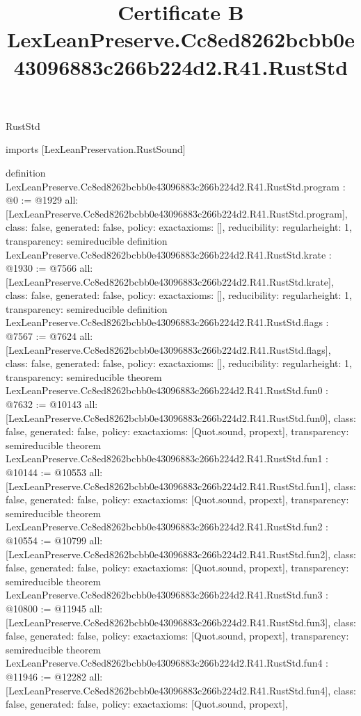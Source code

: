 \begin{lexlean}{RustStd}
\title{Certificate B LexLeanPreserve.Cc8ed8262bcbb0e43096883c266b224d2.R41.RustStd}
\begin{coremodule}
imports [LexLeanPreservation.RustSound]

definition LexLeanPreserve.Cc8ed8262bcbb0e43096883c266b224d2.R41.RustStd.program : @0 := @1929 {
  all: [LexLeanPreserve.Cc8ed8262bcbb0e43096883c266b224d2.R41.RustStd.program],
  class: false,
  generated: false,
  policy: exact{axioms: []},
  reducibility: regular{height: 1},
  transparency: semireducible
}
definition LexLeanPreserve.Cc8ed8262bcbb0e43096883c266b224d2.R41.RustStd.krate : @1930 := @7566 {
  all: [LexLeanPreserve.Cc8ed8262bcbb0e43096883c266b224d2.R41.RustStd.krate],
  class: false,
  generated: false,
  policy: exact{axioms: []},
  reducibility: regular{height: 1},
  transparency: semireducible
}
definition LexLeanPreserve.Cc8ed8262bcbb0e43096883c266b224d2.R41.RustStd.flags : @7567 := @7624 {
  all: [LexLeanPreserve.Cc8ed8262bcbb0e43096883c266b224d2.R41.RustStd.flags],
  class: false,
  generated: false,
  policy: exact{axioms: []},
  reducibility: regular{height: 1},
  transparency: semireducible
}
theorem LexLeanPreserve.Cc8ed8262bcbb0e43096883c266b224d2.R41.RustStd.fun0 : @7632 := @10143 {
  all: [LexLeanPreserve.Cc8ed8262bcbb0e43096883c266b224d2.R41.RustStd.fun0],
  class: false,
  generated: false,
  policy: exact{axioms: [Quot.sound, propext]},
  transparency: semireducible
}
theorem LexLeanPreserve.Cc8ed8262bcbb0e43096883c266b224d2.R41.RustStd.fun1 : @10144 := @10553 {
  all: [LexLeanPreserve.Cc8ed8262bcbb0e43096883c266b224d2.R41.RustStd.fun1],
  class: false,
  generated: false,
  policy: exact{axioms: [Quot.sound, propext]},
  transparency: semireducible
}
theorem LexLeanPreserve.Cc8ed8262bcbb0e43096883c266b224d2.R41.RustStd.fun2 : @10554 := @10799 {
  all: [LexLeanPreserve.Cc8ed8262bcbb0e43096883c266b224d2.R41.RustStd.fun2],
  class: false,
  generated: false,
  policy: exact{axioms: [Quot.sound, propext]},
  transparency: semireducible
}
theorem LexLeanPreserve.Cc8ed8262bcbb0e43096883c266b224d2.R41.RustStd.fun3 : @10800 := @11945 {
  all: [LexLeanPreserve.Cc8ed8262bcbb0e43096883c266b224d2.R41.RustStd.fun3],
  class: false,
  generated: false,
  policy: exact{axioms: [Quot.sound, propext]},
  transparency: semireducible
}
theorem LexLeanPreserve.Cc8ed8262bcbb0e43096883c266b224d2.R41.RustStd.fun4 : @11946 := @12282 {
  all: [LexLeanPreserve.Cc8ed8262bcbb0e43096883c266b224d2.R41.RustStd.fun4],
  class: false,
  generated: false,
  policy: exact{axioms: [Quot.sound, propext]},
}
\end{coremodule}
\end{lexlean}
